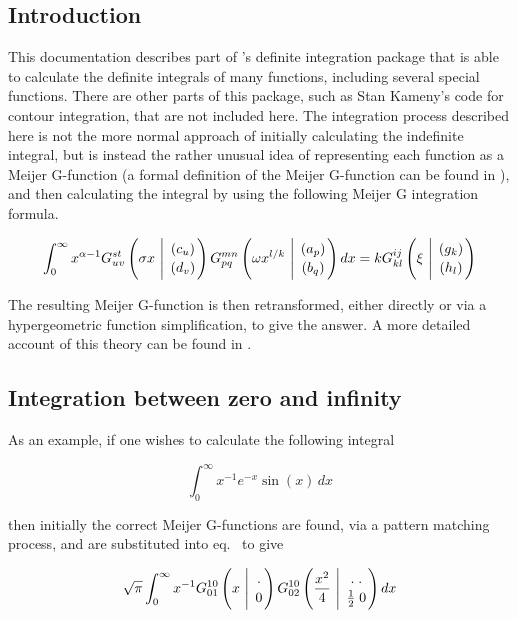 \subsection{Introduction}
\ifdefined{}\else
\newcommand{\MeijerGparams}[2]{\genfrac{}{}{0pt}{}{#1}{#2}}
\fi
This documentation describes part of \REDUCE's definite
integration package that is able to calculate the definite integrals of
many functions, including several special functions.  There are other
parts of this package, such as Stan Kameny's code for contour integration,
that are not included here.  The integration process described here is not
the more normal approach of initially calculating the indefinite integral,
but is instead the rather unusual idea of representing each function as a
Meijer G-function (a formal definition of the Meijer G-function can be
found in \cite {Prudnikov:90c}), and then calculating the integral by using
the following Meijer G integration formula.

\begin{equation}
\int_{0}^{\infty} x^{\alpha-1} G^{s t}_{u v}
\left( \sigma x \  \Bigg\vert \  \MeijerGparams{( c_u)}{(d_v)} \right)
G^{m n}_{p q} \left( \omega x^{l/k} \  \Bigg\vert \ \MeijerGparams{(a_p)}{(b_q)}
\right) dx = k G^{i j}_{k l} \left( \xi \ \Bigg\vert \
\MeijerGparams{(g_k)}{(h_l)} \right) \label{defint:eq1}
\end{equation}

The resulting Meijer G-function is then retransformed, either directly
or via a hypergeometric function simplification, to give
the answer. A more detailed account of this theory can be found in
\cite {Adamchik90}.

\subsection{Integration between zero and infinity}

As an example, if one wishes to calculate the following integral

\[
\int_{0}^{\infty} x^{-1} e^{-x} \sin(x) \, dx
\]

then initially the  correct Meijer G-functions are found, via a
pattern matching
process, and are substituted into eq.~ to give

\[
\sqrt{\pi} \int_{0}^{\infty} x^{-1} G^{1 0}_{0 1} \left(x
\ \Bigg\vert \
\MeijerGparams{.}{0}\right) G^{1 0}_{0 2}\left(\frac{x^{2}}{4}
\ \Bigg\vert \ \MeijerGparams{. \; . }{\frac{1}{2} \; 0} \right) dx
\]

